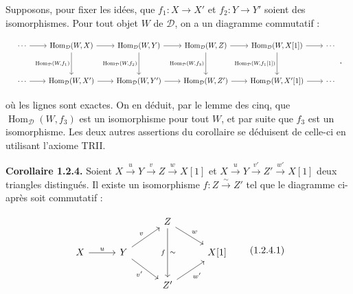 %
\begingroup
\small
\setlength{\abovedisplayskip}{4pt plus 2pt minus 2pt}%
\setlength{\belowdisplayskip}{4pt plus 2pt minus 2pt}%

Supposons, pour fixer les idées, que $f_1\colon X\longrightarrow X'$ et
$f_2\colon Y\longrightarrow Y'$ soient des isomorphismes. Pour tout objet
$W$ de $\mathcal D$, on a un diagramme commutatif :

\begin{equation*}
  \resizebox{0.98\linewidth}{!}{%
    $\begin{tikzcd}[ampersand replacement=\&,column sep=2.15em,row sep=3em]
      \cdots \arrow[r]
        \& \operatorname{Hom}_{\mathcal D}(W,X) \arrow[r] \arrow[d,"{\operatorname{Hom}_{\mathcal D}(W,f_1)}"']
        \& \operatorname{Hom}_{\mathcal D}(W,Y) \arrow[r] \arrow[d,"{\operatorname{Hom}_{\mathcal D}(W,f_2)}"']
        \& \operatorname{Hom}_{\mathcal D}(W,Z) \arrow[r] \arrow[d,"{\operatorname{Hom}_{\mathcal D}(W,f_3)}"']
        \& \operatorname{Hom}_{\mathcal D}(W,X[1]) \arrow[r] \arrow[d,"{\operatorname{Hom}_{\mathcal D}(W,f_1[1])}"']
        \& \cdots \\
      \cdots \arrow[r]
        \& \operatorname{Hom}_{\mathcal D}(W,X') \arrow[r]
        \& \operatorname{Hom}_{\mathcal D}(W,Y') \arrow[r]
        \& \operatorname{Hom}_{\mathcal D}(W,Z') \arrow[r]
        \& \operatorname{Hom}_{\mathcal D}(W,X'[1]) \arrow[r]
        \& \cdots
    \end{tikzcd}$%
  }\,.
\end{equation*}

où les lignes sont exactes. On en déduit, par le lemme des cinq, que
$\operatorname{Hom}_{\mathcal D}(W,f_3)$ est un isomorphisme pour tout $W$,
et par suite que $f_3$ est un isomorphisme. Les deux autres assertions du
corollaire se déduisent de celle-ci en utilisant l'axiome TRII.

\medskip
\noindent\textbf{Corollaire 1.2.4.}\quad
Soient
$X\xrightarrow{u}Y\xrightarrow{v}Z\xrightarrow{w}X[1]$ et
$X\xrightarrow{u}Y\xrightarrow{v'}Z'\xrightarrow{w'}X[1]$
deux triangles distingués. Il existe un isomorphisme
$f\colon Z\xrightarrow{\sim}Z'$ tel que le diagramme ci-après soit
commutatif :

\begin{equation}
  \begin{tikzcd}[column sep=2.8em,row sep=1.7em]
    && Z \arrow[dr,"w"] \arrow[dd,"f"',"\sim"] & \\
    X \arrow[r,"u"] & Y \arrow[ur,"v"] \arrow[dr,"v'"'] && X[1] \\
    && Z' \arrow[ur,"w'"'] &
  \end{tikzcd}
  \tag{1.2.4.1}
\end{equation}

